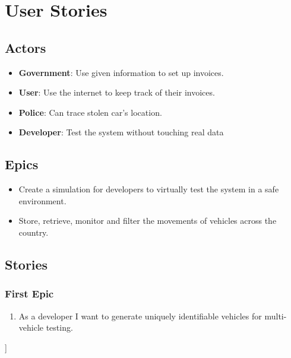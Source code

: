 \chapter{User Stories}
\section{Actors}
\begin{itemize}
\item{\textbf{Government}: Use given information to set up invoices.}
\item{\textbf{User}: Use the internet to keep track of their invoices.}
\item{\textbf{Police}: Can trace stolen car's location.}
\item{\textbf{Developer}: Test the system without touching real data}
\end{itemize}

\section{Epics}
\begin{itemize}
 \item Create a simulation for developers to virtually test the system in a safe environment.
 \item Store, retrieve, monitor and filter the movements of vehicles across the country.
\end{itemize}

\section{Stories}
\subsection{First Epic}
\begin{enumerate}
	\item  As a developer I want to generate uniquely identifiable vehicles for multi-vehicle testing.
	
\end{enumerate}]